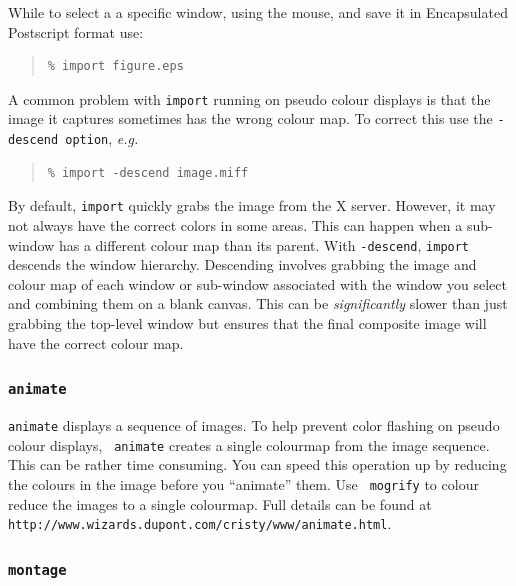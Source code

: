 \documentclass[twoside,11pt]{article}
\newcommand{\htmladdnormallink}[2]{#1}
\newcommand{\htmlref}[2]{#1}
\begin{document}
While to select a a specific window, using the mouse, and save it in
Encapsulated Postscript format use:

\small
\begin{quote}
\begin{verbatim} 
% import figure.eps 
\end{verbatim}
\end{quote}
\normalsize

A common problem with {\tt import} running on \htmlref{pseudo colour
}{sc15_pseudo} displays is that the image it captures sometimes has
the wrong colour map. To correct this use the {\tt -descend option},
{\em e.g.\ } 

\small
\begin{quote}
\begin{verbatim} 
% import -descend image.miff
\end{verbatim}
\end{quote}
\normalsize

By default, {\tt import} quickly grabs the image from the X server.
However, it may not always have the correct colors in some areas. This
can happen when a sub-window has a different colour map than its
parent. With {\tt -descend}, {\tt import} descends the window
hierarchy. Descending involves grabbing the image and colour map of
each window or sub-window associated with the window you select and
combining them on a blank canvas. This can be {\em significantly}
slower than just grabbing the top-level window but ensures that the
final composite image will have the correct colour map.

\subsubsection{{\tt animate}}

{\tt animate} displays a sequence of images. To help prevent color
flashing on \htmlref{pseudo colour}{sc15_pseudo} displays, {\tt
animate} creates a single colourmap from the image sequence. This can
be rather time consuming. You can speed this operation up by reducing
the colours in the image before you ``animate'' them. Use {\tt
mogrify} to colour reduce the images to a single colourmap. Full
details can be found at \htmladdnormallink{{\tt
http://www.wizards.dupont.com/cristy/www/animate.html}}{http://www.wizards.dupont.com/cristy/www/animate.html}.
    
\subsubsection{{\tt montage}}
\end{document}
